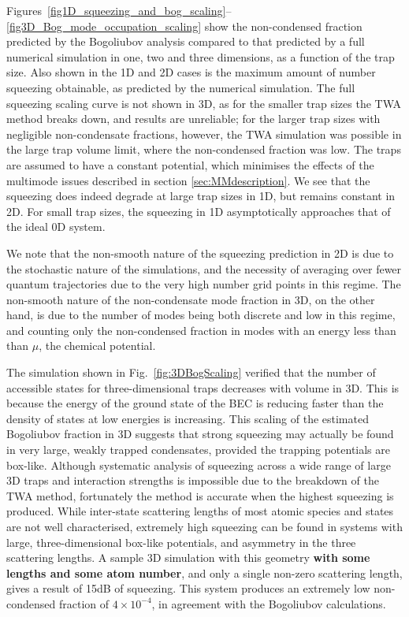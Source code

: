 \documentclass{iopart}
\begin{document}
Figures~\ref{fig1D_squeezing_and_bog_scaling}--\ref{fig3D_Bog_mode_occupation_scaling} show the non-condensed fraction predicted by the Bogoliubov analysis compared to that predicted by a full numerical simulation in one, two and three dimensions, as a function of the trap size. Also shown in the 1D and 2D cases is the maximum amount of number squeezing obtainable, as predicted by the numerical simulation. The full squeezing scaling curve is not shown in 3D, as for the smaller trap sizes the TWA method breaks down, and results are unreliable; for the larger trap sizes with negligible non-condensate fractions, however, the TWA simulation was possible in the large trap volume limit, where the non-condensed fraction was low. The traps are assumed to have a constant potential, which minimises the effects of the multimode issues described in section \ref{sec:MMdescription}.  We see that the squeezing does indeed degrade at large trap sizes in 1D, but remains constant in 2D. For small trap sizes, the squeezing in 1D asymptotically approaches that of the ideal 0D system.

We note that the non-smooth nature of the squeezing prediction in 2D is due to the stochastic nature of the simulations, and the necessity of averaging over fewer quantum trajectories due to the very high number grid points in this regime. The non-smooth nature of the non-condensate mode fraction in 3D, on the other hand, is due to the number of modes being both discrete and low in this regime, and counting only the non-condensed fraction in modes with an energy less than than $\mu$, the chemical potential.

The simulation shown in Fig.~\ref{fig:3DBogScaling} verified that the number of accessible states for three-dimensional traps decreases with volume in 3D.  This is because the energy of the ground state of the BEC is reducing faster than the density of states at low energies is increasing.  This scaling of the estimated Bogoliubov fraction in 3D suggests that strong squeezing may actually be found in very large, weakly trapped condensates, provided the trapping potentials are box-like.  Although systematic analysis of squeezing across a wide range of large 3D traps and interaction strengths is impossible due to the breakdown of the TWA method, fortunately the method is accurate when the highest squeezing is produced.  While inter-state scattering lengths of most atomic species and states are not well characterised, extremely high squeezing can be found in systems with large, three-dimensional box-like potentials, and asymmetry in the three scattering lengths.  A sample 3D simulation with this geometry \textbf{with some lengths and some atom number}, and only a single non-zero scattering length, gives a result of 15dB of squeezing.  This system produces an extremely low non-condensed fraction of $4 \times 10^{-4}$, in agreement with the Bogoliubov calculations.  
\end{document}
